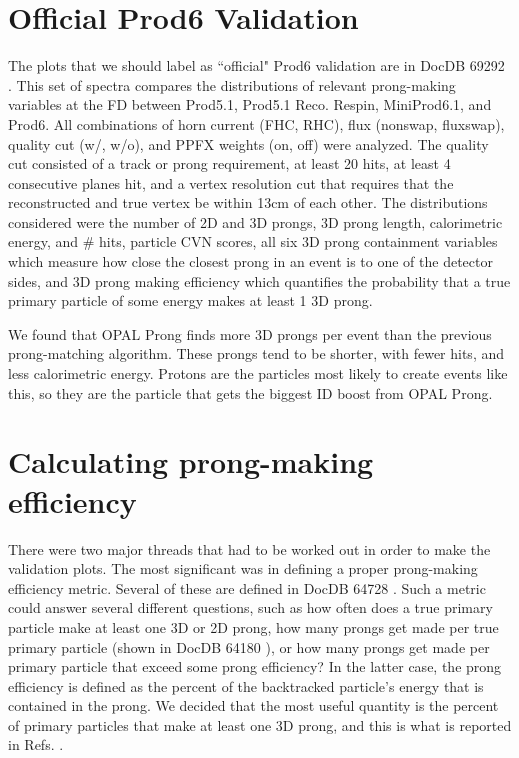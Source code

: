 \documentclass{article}
\begin{document}
\section{Official Prod6 Validation}
The plots that we should label as ``official" Prod6 validation are in DocDB 69292 \cite{69292}. This set of spectra compares the distributions of relevant prong-making variables at the FD between Prod5.1, Prod5.1 Reco. Respin, MiniProd6.1, and Prod6. All combinations of horn current (FHC, RHC), flux (nonswap, fluxswap), quality cut (w/, w/o), and PPFX weights (on, off) were analyzed. The quality cut consisted of a track or prong requirement, at least 20 hits, at least 4 consecutive planes hit, and a vertex resolution cut that requires that the reconstructed and true vertex be within 13cm of each other. The distributions considered were the number of 2D and 3D prongs, 3D prong length, calorimetric energy, and \# hits, particle CVN scores, all six 3D prong containment variables which measure how close the closest prong in an event is to one of the detector sides, and 3D prong making efficiency which quantifies the probability that a true primary particle of some energy makes at least 1 3D prong.

We found that OPAL Prong finds more 3D prongs per event than the previous prong-matching algorithm. These prongs tend to be shorter, with fewer hits, and less calorimetric energy. Protons are the particles most likely to create events like this, so they are the particle that gets the biggest ID boost from OPAL Prong. 

\section{Calculating prong-making efficiency}
There were two major threads that had to be worked out in order to make the validation plots. The most significant was in defining a proper prong-making efficiency metric. Several of these are defined in DocDB 64728 \cite{64728}. Such a metric could answer several different questions, such as how often does a true primary particle make at least one 3D or 2D prong, how many prongs get made per true primary particle (shown in DocDB 64180 \cite{64180}), or how many prongs get made per primary particle that exceed some prong efficiency? In the latter case, the prong efficiency is defined as the percent of the backtracked particle's energy that is contained in the prong. We decided that the most useful quantity is the percent of primary particles that make at least one 3D prong, and this is what is reported in Refs. \cite{64779, 68251, 68359, 69292}.
\end{document}
